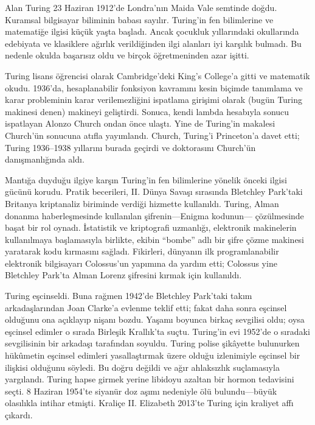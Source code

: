 \documentclass[../../../include/open-logic-section]{subfiles}
\begin{document}


Alan Turing 23 Haziran 1912'de Londra'nın Maida Vale semtinde doğdu. Kuramsal
bilgisayar biliminin babası sayılır. Turing'in fen bilimlerine ve matematiğe
ilgisi küçük yaşta başladı. Ancak çocukluk yıllarındaki okullarında edebiyata
ve klasiklere ağırlık verildiğinden ilgi alanları iyi karşılık bulmadı. Bu
nedenle okulda başarısız oldu ve birçok öğretmeninden azar işitti.


Turing lisans öğrencisi olarak Cambridge'deki King's College'a gitti ve
matematik okudu. 1936'da, hesaplanabilir fonksiyon kavramını kesin biçimde
tanımlama ve karar probleminin karar verilemezliğini ispatlama girişimi olarak
(bugün Turing makinesi denen) makineyi geliştirdi. Sonuca, kendi lambda
hesabıyla sonucu ispatlayan Alonzo Church ondan önce ulaştı. Yine de Turing'in
makalesi Church'ün sonucuna atıfla yayımlandı. Church, Turing'i Princeton'a
davet etti; Turing 1936--1938 yıllarını burada geçirdi ve doktorasını Church'ün
danışmanlığında aldı.

Mantığa duyduğu ilgiye karşın Turing'in fen bilimlerine yönelik önceki ilgisi
gücünü korudu. Pratik becerileri, II. Dünya Savaşı sırasında Bletchley
Park'taki Britanya kriptanaliz biriminde verdiği hizmette kullanıldı. Turing,
Alman donanma haberleşmesinde kullanılan şifrenin---Enigma kodunun---
çözülmesinde başat bir rol oynadı. İstatistik ve kriptografi uzmanlığı,
elektronik makinelerin kullanılmaya başlamasıyla birlikte, ekibin ``bombe''
adlı bir şifre çözme makinesi yaratarak kodu kırmasını sağladı. Fikirleri,
dünyanın ilk programlanabilir elektronik bilgisayarı Colossus'un yapımına da
yardım etti; Colossus yine Bletchley Park'ta Alman Lorenz şifresini kırmak
için kullanıldı.

Turing eşcinseldi. Buna rağmen 1942'de Bletchley Park'taki takım
arkadaşlarından Joan Clarke'a evlenme teklif etti; fakat daha sonra eşcinsel
olduğunu ona açıklayıp nişanı bozdu. Yaşamı boyunca birkaç sevgilisi oldu;
oysa eşcinsel edimler o sırada Birleşik Krallık'ta suçtu. Turing'in evi
1952'de o sıradaki sevgilisinin bir arkadaşı tarafından soyuldu. Turing polise
şikâyette bulunurken hükûmetin eşcinsel edimleri yasallaştırmak üzere olduğu
izlenimiyle eşcinsel bir ilişkisi olduğunu söyledi. Bu doğru değildi ve ağır
ahlaksızlık suçlamasıyla yargılandı. Turing hapse girmek yerine libidoyu
azaltan bir hormon tedavisini seçti. 8 Haziran 1954'te siyanür doz aşımı
nedeniyle ölü bulundu---büyük olasılıkla intihar etmişti. Kraliçe II.
Elizabeth 2013'te Turing için kraliyet affı çıkardı.
\end{document}
